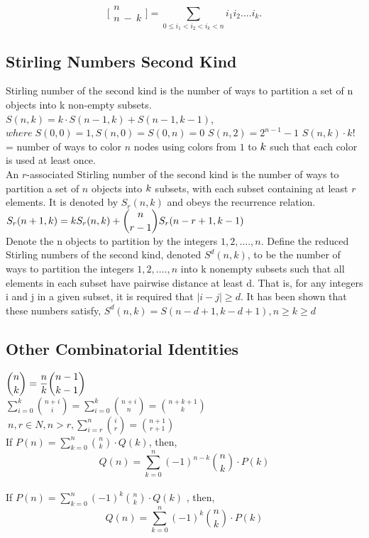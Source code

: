 \begin{multicols*}{\MCOLS}
\[\displaystyle \bigl[\!\begin{smallmatrix} n \\ n\ -\ k \end{smallmatrix}\!\bigr] = \sum_{0 \leq i_1 < i_2 < i_k < n}{i_1i_2....i_k.}\]

\subsection{Stirling Numbers Second Kind}
Stirling number of the second kind is the number of ways to partition a set of n objects into k non-empty subsets. \\
$S(n,k)=k \cdot S(n-1,k)+S(n-1,k-1)$, \(where \; S(0,0)=1,S(n,0)=S(0,n)=0\)
$S(n,2)=2^{n-1}-1$ 
$S(n,k) \cdot k!$ = number of ways to color $n$ nodes using colors from $\displaystyle 1$ to $\displaystyle \displaystyle k$ such that each color is used at least once. \\
An $r$-associated Stirling number of the second kind is the number of ways to partition a set of $n$ objects into $\displaystyle \displaystyle k$ subsets, with each subset containing at least $r$ elements. It is denoted by $S_r( n , k )$ and obeys the recurrence relation. $\displaystyle \displaystyle S_r(n+1,k) = k S_r(n,k) + \binom{n}{r-1} S_r(n-r+1,k-1)$ \\ 
Denote the n objects to partition by the integers $\displaystyle 1, 2, …., n$. Define the reduced Stirling numbers of the second kind, denoted $S^d(n, k)$, to be the number of ways to partition the integers $\displaystyle 1, 2, …., n$ into k nonempty subsets such that all elements in each subset have pairwise distance at least d. That is, for any integers i and j in a given subset, it is required that $|i - j| \geq d$. It has been shown that these numbers satisfy, \(S^d(n, k) = S(n - d + 1, k - d + 1), n \geq k \geq d\)
\subsection{Other Combinatorial Identities}
$\displaystyle \displaystyle {n \choose k}=\frac{n}{k}{n-1 \choose k-1}$ \\
$\displaystyle \sum \limits_{i= 0}^k{n+i \choose i}= \sum \limits_{i= 0}^k{n+i \choose n} = {n+k+1 \choose k}$ \\
$\displaystyle \ n,r \in N, n > r, \sum \limits_{i=r}^n{i \choose r}={n+1 \choose r+1}$ \\
If $\displaystyle P(n)=\sum_{k=0}^{n}{n \choose k} \cdot Q(k)$, then,
\[Q(n)=\sum_{k=0}^{n}(-1)^{n-k}{n \choose k} \cdot P(k)\] \\
If $\displaystyle P(n)=\sum_{k=0}^{n}(-1)^{k}{n \choose k} \cdot Q(k)$ , then,
\[Q(n)=\sum_{k=0}^{n}(-1)^{k}{n \choose k} \cdot P(k)\]


\end{multicols*}
